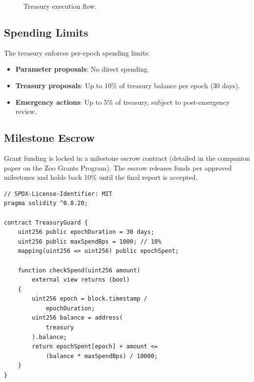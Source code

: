 \documentclass[11pt,letterpaper]{article}
\begin{document}
\begin{figure}[h]
\centering
{}
\caption{Treasury execution flow.}
\label{fig:treasury}
\end{figure}

\subsection{Spending Limits}

The treasury enforces per-epoch spending limits:

\begin{itemize}
    \item \textbf{Parameter proposals}: No direct spending.
    \item \textbf{Treasury proposals}: Up to 10\% of treasury balance per epoch (30 days).
    \item \textbf{Emergency actions}: Up to 5\% of treasury, subject to post-emergency review.
\end{itemize}

\subsection{Milestone Escrow}

Grant funding is locked in a milestone escrow contract (detailed in the companion paper on the Zoo Grants Program). The escrow releases funds per approved milestones and holds back 10\% until the final report is accepted.

\begin{lstlisting}[language=Solidity,caption=Treasury spending guard]
// SPDX-License-Identifier: MIT
pragma solidity ^0.8.20;

contract TreasuryGuard {
    uint256 public epochDuration = 30 days;
    uint256 public maxSpendBps = 1000; // 10%
    mapping(uint256 => uint256) public epochSpent;

    function checkSpend(uint256 amount)
        external view returns (bool)
    {
        uint256 epoch = block.timestamp /
            epochDuration;
        uint256 balance = address(
            treasury
        ).balance;
        return epochSpent[epoch] + amount <=
            (balance * maxSpendBps) / 10000;
    }
}
\end{lstlisting}
\end{document}
